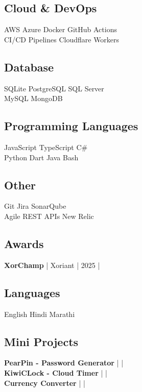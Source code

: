 \documentclass[]{deedy-resume-reversed}
\begin{document}
\begin{minipage}[t]{0.33\textwidth}
\subsection{Cloud \& DevOps}
AWS \textbullet Azure \textbullet Docker \textbullet GitHub Actions \\
CI/CD Pipelines \textbullet Cloudflare Workers \\
\sectionsep

\subsection{Database}
SQLite \textbullet PostgreSQL \textbullet SQL Server \\ 
MySQL \textbullet MongoDB  \sectionsep

\subsection{Programming Languages}
JavaScript \textbullet TypeScript \textbullet C\# \\ 
Python \textbullet Dart \textbullet Java \textbullet Bash
\sectionsep

\subsection{Other}
Git \textbullet Jira \textbullet SonarQube \\
Agile \textbullet REST APIs \textbullet New Relic
\sectionsep

\subsection{Awards}
\textbf{XorChamp} | Xoriant | 2025  | 
\href{https://github.com/sunnydodti/resume/blob/main/awards/XorChamp%20-%20Sunny%20Dodti.pdf}{\faExternalLink } 
\sectionsep

\subsection{Languages}
English \textbullet Hindi \textbullet Marathi \\
\sectionsep

\subsection{Mini Projects}

\textbf{PearPin - Password Generator} | \href{https://github.com/sunnydodti/pearpin}{\faGithub} | \href{https://pearpin.persist.site}{\faExternalLink} \\

\textbf{KiwiCLock - Cloud Timer} | \href{https://github.com/sunnydodti/kiwiclock}{\faGithub} | \href{https://kiwiclock.persist.site}{\faExternalLink} \\

\textbf{Currency Converter} | \href{https://github.com/sunnydodti/currency_converter}{\faGithub} | \href{https://sunnydodti.github.io/currency_converter}{\faExternalLink}
\sectionsep

\end{minipage}
\end{document}

